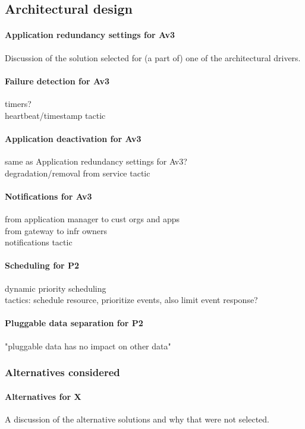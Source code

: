 \subsection{Architectural design}
    \paragraph{Application redundancy settings for Av3}
    Discussion of the solution selected for (a part of) one of the architectural
    drivers.

    \paragraph{Failure detection for Av3}
    timers? \\
    heartbeat/timestamp tactic

    \paragraph{Application deactivation for Av3}
    same as Application redundancy settings for Av3? \\
    degradation/removal from service tactic

    \paragraph{Notifications for Av3}
    from application manager to cust orgs and apps \\
    from gateway to infr owners \\
    notifications tactic

    \paragraph{Scheduling for P2}
    dynamic priority scheduling \\
    tactics: schedule resource, prioritize events, also limit event response?

    \paragraph{Pluggable data separation for P2}
    "pluggable data has no impact on other data"

\subsubsection{Alternatives considered}
    \paragraph{Alternatives for X}
    A discussion of the alternative solutions and why that were not selected.

